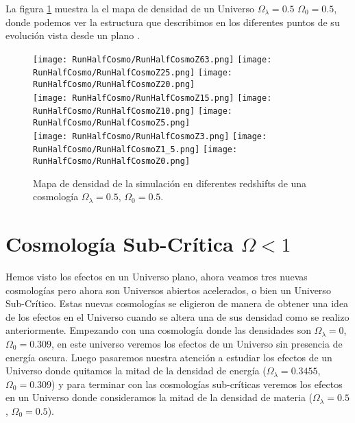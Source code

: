 La figura \ref{fig:HalfCosmo-DensityMap} muestra la el mapa de densidad de un Universo $\Omega_\lambda = 0.5 $ $\Omega_0 = 0.5$, donde podemos ver la estructura que describimos  en los diferentes puntos de su evolución vista desde un plano .
\begin{figure}[H]
    \centering

    \texttt{[image: RunHalfCosmo/RunHalfCosmoZ63.png]}   %
    \texttt{[image: RunHalfCosmo/RunHalfCosmoZ25.png]}   %
    \texttt{[image: RunHalfCosmo/RunHalfCosmoZ20.png]}   %
    \\
    \texttt{[image: RunHalfCosmo/RunHalfCosmoZ15.png]}   %
    \texttt{[image: RunHalfCosmo/RunHalfCosmoZ10.png]}   %
    \texttt{[image: RunHalfCosmo/RunHalfCosmoZ5.png]}    %
    \\
    \texttt{[image: RunHalfCosmo/RunHalfCosmoZ3.png]}    %
    \texttt{[image: RunHalfCosmo/RunHalfCosmoZ1\_5.png]}  %
    \texttt{[image: RunHalfCosmo/RunHalfCosmoZ0.png]}    %
    \caption[Mapa de densidad de un Universo $\Omega_\lambda = 0.5 $, $\Omega_0 = 0.5$ en en diferentes redshift]{ \footnotesize Mapa de densidad de la simulación en diferentes redshifts de una cosmología $\Omega_\lambda = 0.5 $, $\Omega_0 = 0.5$. }
    \label{fig:HalfCosmo-DensityMap}
\end{figure}

\section[Cosmología Sub-Crítica \texorpdfstring{$\Omega < 1$}{Omega < 1}]{Cosmología Sub-Crítica \texorpdfstring{$\Omega < 1$}{Omega < 1}}

\noindent Hemos visto los efectos en un Universo plano, ahora veamos tres nuevas cosmologías pero ahora son Universos abiertos acelerados, o bien un Universo Sub-Crítico. Estas nuevas cosmologías se eligieron de manera de obtener una idea de los efectos en el Universo cuando se altera una de sus densidad como se realizo anteriormente. Empezando con una cosmología donde las densidades son $\Omega_\lambda = 0$, $\Omega_0 = 0.309$, en este universo veremos los efectos de un Universo sin presencia de energía oscura. Luego pasaremos nuestra atención a estudiar los efectos de un Universo donde quitamos la mitad de la densidad de energía ($\Omega_\lambda = 0.3455$, $\Omega_0 = 0.309$) y para terminar con las cosmologías sub-críticas veremos los efectos en un Universo donde consideramos la mitad de la densidad de materia ($\Omega_\lambda = 0.5$, $\Omega_0 = 0.5$).


